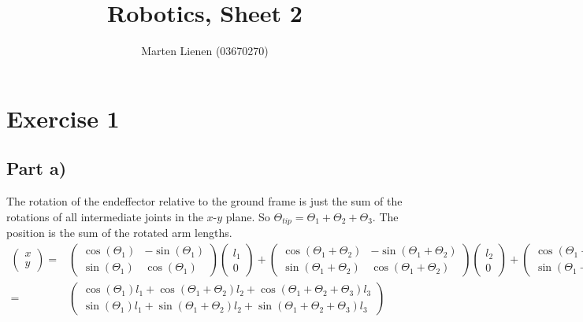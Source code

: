 \documentclass[10pt,a4paper]{article}
\title{Robotics, Sheet 2}
\author{Marten Lienen (03670270)}
\begin{document}
\maketitle

\section*{Exercise 1}

\subsection*{Part a)}

The rotation of the endeffector relative to the ground frame is just the sum of the rotations of all intermediate joints in the $x$-$y$ plane.
So $\Theta_{tip} = \Theta_{1} + \Theta_{2} + \Theta_{3}$.
The position is the sum of the rotated arm lengths.
\begin{align*}
  \begin{pmatrix}
    x\\y
  \end{pmatrix} = & \begin{pmatrix}
    \cos(\Theta_{1}) & -\sin(\Theta_{1})\\
    \sin(\Theta_{1}) & \cos(\Theta_{1})
  \end{pmatrix} \begin{pmatrix}
    l_{1}\\0
  \end{pmatrix} + \begin{pmatrix}
    \cos(\Theta_{1} + \Theta_{2}) & -\sin(\Theta_{1} + \Theta_{2})\\
    \sin(\Theta_{1} + \Theta_{2}) & \cos(\Theta_{1} + \Theta_{2})
  \end{pmatrix} \begin{pmatrix}
    l_{2}\\0
  \end{pmatrix} + \begin{pmatrix}
    \cos(\Theta_{1} + \Theta_{2} + \Theta_{3}) & -\sin(\Theta_{1} + \Theta_{2} + \Theta_{3})\\
    \sin(\Theta_{1} + \Theta_{2} + \Theta_{3}) & \cos(\Theta_{1} + \Theta_{2} + \Theta_{3})
  \end{pmatrix} \begin{pmatrix}
    l_{3}\\0
  \end{pmatrix}\\
  = & \begin{pmatrix}
    \cos(\Theta_{1})l_{1} + \cos(\Theta_{1} + \Theta_{2})l_{2} + \cos(\Theta_{1} + \Theta_{2} + \Theta_{3})l_{3}\\
    \sin(\Theta_{1})l_{1} + \sin(\Theta_{1} + \Theta_{2})l_{2} + \sin(\Theta_{1} + \Theta_{2} + \Theta_{3})l_{3}
  \end{pmatrix}
\end{align*}
\end{document}
